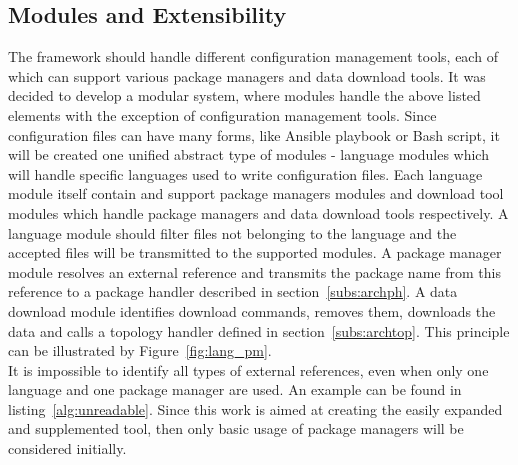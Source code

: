 \subsection{Modules and Extensibility}
The framework should handle different configuration management tools, each of which can support various package managers and data download tools.
It was decided to develop a modular system, where modules handle the above listed elements with the exception of configuration management tools.
Since configuration files can have many forms, like Ansible playbook or Bash script, it will be created one unified abstract type of modules - language modules which will handle specific languages used to write configuration files.
Each language module itself contain and support package managers modules and download tool modules which handle package managers and data download tools respectively.
A language module should filter files not belonging to the language and the accepted files will be transmitted to the supported modules.
A package manager module resolves an external reference and transmits the package name from this reference to a package handler described in section~\ref{subs:archph}.
A data download module identifies download commands, removes them, downloads the data and calls a topology handler defined in section~\ref{subs:archtop}. 
This principle can be illustrated by Figure~\ref{fig:lang_pm}.
\\
It is impossible to identify all types of external references, even when only one language and one package manager are used.
An example can be found in listing~\ref{alg:unreadable}.
Since this work is aimed at creating the easily expanded and supplemented tool, then only basic usage of package managers will be considered initially.\\

